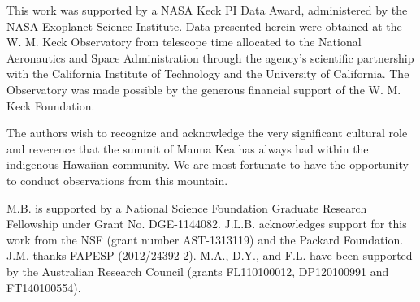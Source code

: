 \documentclass[twocolumn,trackchanges]{aastex61}
\begin{document}
\bigskip
\acknowledgements


This work was supported by a NASA Keck PI Data Award, administered by the NASA Exoplanet Science Institute. Data presented herein were obtained at the W. M. Keck Observatory from telescope time allocated to the National Aeronautics and Space Administration through the agency's scientific partnership with the California Institute of Technology and the University of California. The Observatory was made possible by the generous financial support of the W. M. Keck Foundation.

The authors wish to recognize and acknowledge the very significant cultural role and reverence that the summit of Mauna Kea has always had within the indigenous Hawaiian community. We are most fortunate to have the opportunity to conduct observations from this mountain.

M.B. is supported by a National Science Foundation Graduate Research Fellowship under Grant No. DGE-1144082.  J.L.B. acknowledges support for this work from the NSF (grant number AST-1313119) and the Packard Foundation.  J.M. thanks FAPESP (2012/24392-2). M.A., D.Y., and F.L. have been supported by the Australian Research Council
(grants FL110100012, DP120100991 and FT140100554).



%
%





\pagebreak
\end{document}
